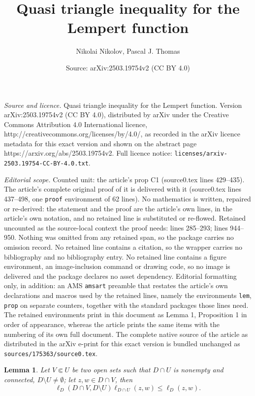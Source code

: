 \documentclass[10pt,a4paper]{amsart}
\title{Quasi triangle inequality for the Lempert function}
\author{Nikolai Nikolov, Pascal J. Thomas}
\date{Source: arXiv:2503.19754v2 (CC BY 4.0)}
\newtheorem{lem}{Lemma}
\begin{document}
\maketitle

\noindent\emph{Source and licence.} Quasi triangle inequality for the Lempert function. Version arXiv:2503.19754v2 (CC BY 4.0), distributed by arXiv under the Creative Commons Attribution 4.0 International licence, http://creativecommons.org/licenses/by/4.0/, as recorded in the arXiv licence metadata for this exact version and shown on the abstract page https://arxiv.org/abs/2503.19754v2. Full licence notice: \texttt{licenses/arxiv-2503.19754-CC-BY-4.0.txt}.\par\smallskip

\noindent\textit{Editorial scope.} Counted unit: the article's prop C1 (source0.tex lines 429--435). The article's complete original proof of it is delivered with it (source0.tex lines 437--498, one \texttt{proof} environment of 62 lines). No mathematics is written, repaired or re-derived: the statement and the proof are the article's own lines, in the article's own notation, and no retained line is substituted or re-flowed.  Retained uncounted as the source-local context the proof needs: lines 285--293; lines 944--950.  Nothing was omitted from any retained span, so the package carries no omission record.  No retained line contains a citation, so the wrapper carries no bibliography and no bibliography entry.  No retained line contains a figure environment, an image-inclusion command or drawing code, so no image is delivered and the package declares no asset dependency.  Editorial formatting only, in addition: an AMS \texttt{amsart} preamble that restates the article's own declarations and macros used by the retained lines, namely the environments \texttt{lem}, \texttt{prop} on separate counters, together with the standard packages those lines need.  The retained environments print in this document as Lemma 1, Proposition 1 in order of appearance, whereas the article prints the same items with the numbering of its own full document.  The complete native source of the article as distributed in the arXiv e-print for this exact version is bundled unchanged as \texttt{sources/175363/source0.tex}.
\begin{lem}
\label{royfin}
Let $V \Subset U$ be two open sets such that $D\cap U$ is nonempty and connected, $D\setminus U \neq \emptyset$;
let $z,w \in D\cap V$,
then
\[
\ell_D (D\cap V, D\setminus U)\ell_{D\cap U}(z,w) \le \ell_D(z,w) .
\]
\end{lem}
\end{document}
